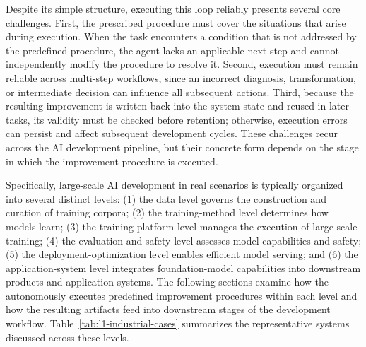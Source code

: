 Despite its simple structure, executing this loop reliably presents several core challenges. First, the prescribed procedure must cover the situations that arise during execution. When the task encounters a condition that is not addressed by the predefined procedure, the agent lacks an applicable next step and cannot independently modify the procedure to resolve it. Second, execution must remain reliable across multi-step workflows, since an incorrect diagnosis, transformation, or intermediate decision can influence all subsequent actions. Third, because the resulting improvement is written back into the system state and reused in later tasks, its validity must be checked before retention; otherwise, execution errors can persist and affect subsequent development cycles. These challenges recur across the AI development pipeline, but their concrete form depends on the stage in which the improvement procedure is executed.

Specifically, large-scale AI development in real scenarios is typically organized into several distinct levels: (1) the data level governs the construction and curation of training corpora; (2) the training-method level determines how models learn; (3) the training-platform level manages the execution of large-scale training; (4) the evaluation-and-safety level assesses model capabilities and safety; (5) the deployment-optimization level enables efficient model serving; and (6) the application-system level integrates foundation-model capabilities into downstream products and application systems. The following sections examine how the \AISystem{} autonomously executes predefined improvement procedures within each level and how the resulting artifacts feed into downstream stages of the development workflow. Table~\ref{tab:l1-industrial-cases} summarizes the representative systems discussed across these levels.

